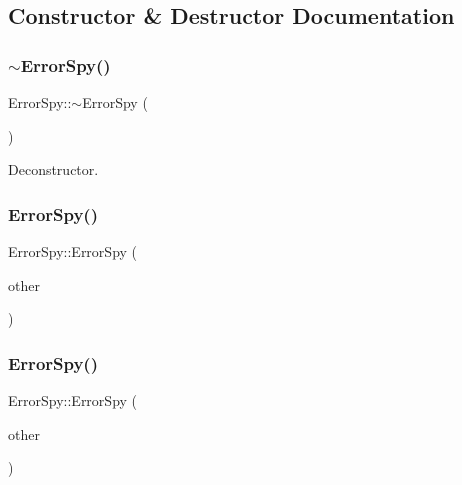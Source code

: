 \subsection{Constructor \& Destructor Documentation}
\mbox{\label{class_error_spy_aa9afe918ddadd03debbbbae613c89e74}} 
\subsubsection{\texorpdfstring{$\sim$\+Error\+Spy()}{~ErrorSpy()}}
{\footnotesize\ttfamily Error\+Spy\+::$\sim$\+Error\+Spy (\begin{DoxyParamCaption}{ }\end{DoxyParamCaption})}



Deconstructor. 

\mbox{\label{class_error_spy_aa10c8604df16528fa51fc00e9b84e184}} 
\subsubsection{\texorpdfstring{Error\+Spy()}{ErrorSpy()}\hspace{0.1cm}{\footnotesize\ttfamily [1/3]}}
{\footnotesize\ttfamily Error\+Spy\+::\+Error\+Spy (\begin{DoxyParamCaption}\item[{const \hyperlink{class_error_spy}{Error\+Spy} \&}]{other }\end{DoxyParamCaption})\hspace{0.3cm}{\ttfamily [delete]}}

\mbox{\label{class_error_spy_a07d843cb06eb0a6bfd47734b6c31e289}} 
\subsubsection{\texorpdfstring{Error\+Spy()}{ErrorSpy()}\hspace{0.1cm}{\footnotesize\ttfamily [2/3]}}
{\footnotesize\ttfamily Error\+Spy\+::\+Error\+Spy (\begin{DoxyParamCaption}\item[{const \hyperlink{class_error_spy}{Error\+Spy} \&\&}]{other }\end{DoxyParamCaption})\hspace{0.3cm}{\ttfamily [delete]}}

